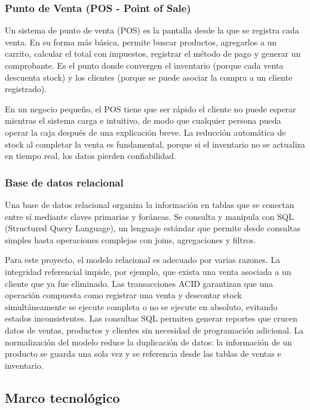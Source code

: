 \documentclass[spanish]{ieee_upb}
\begin{document}
\subsubsection{Punto de Venta (POS - Point of Sale)}

Un sistema de punto de venta (POS) es la pantalla desde la que se registra cada venta. En su forma más básica, permite buscar productos, agregarlos a un carrito, calcular el total con impuestos, registrar el método de pago y generar un comprobante. Es el punto donde convergen el inventario (porque cada venta descuenta stock) y los clientes (porque se puede asociar la compra a un cliente registrado).

En un negocio pequeño, el POS tiene que ser rápido el cliente no puede esperar mientras el sistema carga  e intuitivo, de modo que cualquier persona pueda operar la caja después de una explicación breve. La reducción automática de stock al completar la venta es fundamental, porque si el inventario no se actualiza en tiempo real, los datos pierden confiabilidad.

\subsubsection{Base de datos relacional}

Una base de datos relacional organiza la información en tablas que se conectan entre sí mediante claves primarias y foráneas. Se consulta y manipula con SQL (Structured Query Language), un lenguaje estándar que permite desde consultas simples hasta operaciones complejas con joins, agregaciones y filtros.

Para este proyecto, el modelo relacional es adecuado por varias razones. La integridad referencial impide, por ejemplo, que exista una venta asociada a un cliente que ya fue eliminado. Las transacciones ACID garantizan que una operación compuesta como registrar una venta y descontar stock simultáneamente  se ejecute completa o no se ejecute en absoluto, evitando estados inconsistentes. Las consultas SQL permiten generar reportes que crucen datos de ventas, productos y clientes sin necesidad de programación adicional. La normalización del modelo reduce la duplicación de datos: la información de un producto se guarda una sola vez y se referencia desde las tablas de ventas e inventario.

\subsection{Marco tecnológico}
\end{document}
